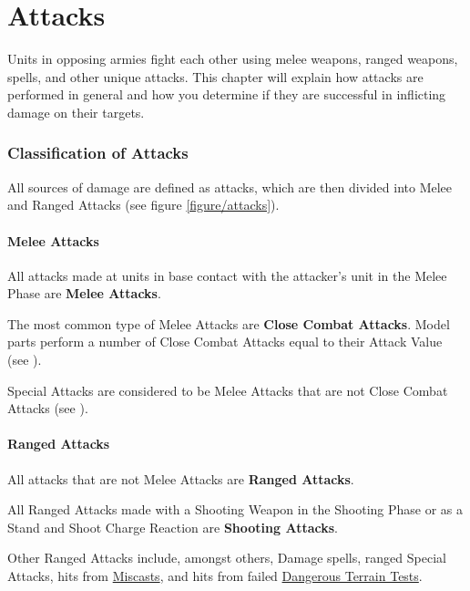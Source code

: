 
\part{Attacks}
\label{attacks}

Units in opposing armies fight each other using melee weapons, ranged weapons, spells, and other unique attacks. This chapter will explain how attacks are performed in general and how you determine if they are successful in inflicting damage on their targets.

\section{Classification of Attacks}

All sources of damage are defined as attacks, which are then divided into Melee and Ranged Attacks (see figure \ref{figure/attacks}).

\subsection{Melee Attacks}
\label{melee_attacks}

All attacks made at units in base contact with the attacker's unit in the Melee Phase are \textbf{Melee Attacks}.

The most common type of Melee Attacks are \textbf{Close Combat Attacks}. Model parts perform a number of Close Combat Attacks equal to their Attack Value (see ).

Special Attacks are considered to be Melee Attacks that are not Close Combat Attacks (see ).

\subsection{Ranged Attacks}
\label{ranged_attacks}

All attacks that are not Melee Attacks are \textbf{Ranged Attacks}.

All Ranged Attacks made with a Shooting Weapon in the Shooting Phase or as a Stand and Shoot Charge Reaction are \textbf{Shooting Attacks}.

Other Ranged Attacks include, amongst others, Damage spells, ranged Special Attacks, hits from \hyperref[miscast]{Miscasts}, and hits from failed \hyperref[dangerous_terrain]{Dangerous Terrain Tests}.

